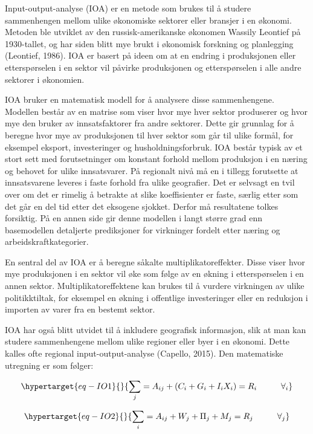 \documentclass[
]{article}
\begin{document}
Input-output-analyse (IOA) er en metode som brukes til å studere
sammenhengen mellom ulike økonomiske sektorer eller bransjer i en
økonomi. Metoden ble utviklet av den russisk-amerikanske økonomen
Wassily Leontief på 1930-tallet, og har siden blitt mye brukt i
økonomisk forskning og planlegging (Leontief, 1986). IOA er basert på
ideen om at en endring i produksjonen eller etterspørselen i en sektor
vil påvirke produksjonen og etterspørselen i alle andre sektorer i
økonomien.

IOA bruker en matematisk modell for å analysere disse sammenhengene.
Modellen består av en matrise som viser hvor mye hver sektor produserer
og hvor mye den bruker av innsatsfaktorer fra andre sektorer. Dette gir
grunnlag for å beregne hvor mye av produksjonen til hver sektor som går
til ulike formål, for eksempel eksport, investeringer og
husholdningsforbruk. IOA består typisk av et stort sett med
forutsetninger om konstant forhold mellom produksjon i en næring og
behovet for ulike innsatsvarer. På regionalt nivå må en i tillegg
forutsette at innsatsvarene leveres i faste forhold fra ulike
geografier. Det er selvsagt en tvil over om det er rimelig å betrakte at
slike koeffisienter er faste, særlig etter som det går en del tid etter
det eksogene sjokket. Derfor må resultatene tolkes forsiktig. På en
annen side gir denne modellen i langt større grad enn basemodellen
detaljerte prediksjoner for virkninger fordelt etter næring og
arbeidskraftkategorier.

En sentral del av IOA er å beregne såkalte multiplikatoreffekter. Disse
viser hvor mye produksjonen i en sektor vil øke som følge av en økning i
etterspørselen i en annen sektor. Multiplikatoreffektene kan brukes til
å vurdere virkningen av ulike politikktiltak, for eksempel en økning i
offentlige investeringer eller en reduksjon i importen av varer fra en
bestemt sektor.

IOA har også blitt utvidet til å inkludere geografisk informasjon, slik
at man kan studere sammenhengene mellom ulike regioner eller byer i en
økonomi. Dette kalles ofte regional input-output-analyse (Capello,
2015). Den matematiske utregning er som følger:

\begin{equation}\protect\hypertarget{eq-IO1}{}{
\sum_j = A_{ij} + (C_i + G_i + I_i X_i) = R_i \hspace{1cm} \forall_i
}\label{eq-IO1}\end{equation}

\begin{equation}\protect\hypertarget{eq-IO2}{}{
\sum_i = A_{ij} + W_j + \Pi_j + M_j = R_j \hspace{1cm} \forall_j
}\label{eq-IO2}\end{equation}
\end{document}
